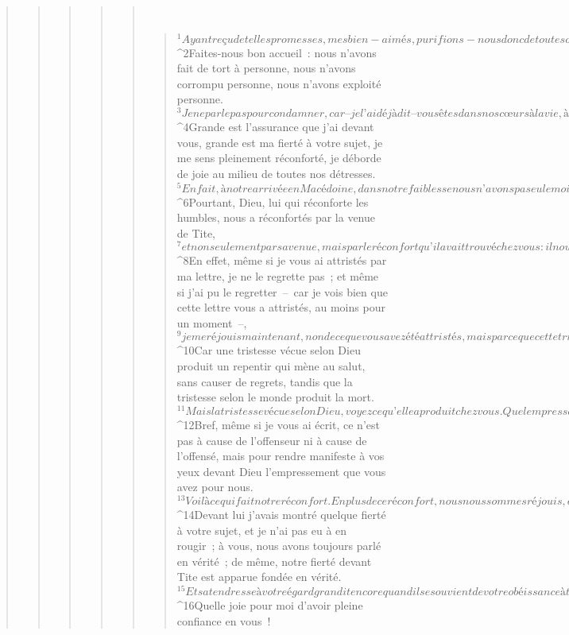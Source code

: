 \begin{verse}
\begin{verse}
\begin{verse}
\begin{verse}
\begin{verse}
         
      \bchapter{}
      \begin{verse}
${}^{1}Ayant reçu de telles promesses, mes bien-aimés, purifions-nous donc de toute souillure de la chair et de l’esprit ; achevons de nous sanctifier dans la crainte de Dieu.
${}^{2}Faites-nous bon accueil : nous n’avons fait de tort à personne, nous n’avons corrompu personne, nous n’avons exploité personne. 
${}^{3}Je ne parle pas pour condamner, car – je l’ai déjà dit – vous êtes dans nos cœurs à la vie, à la mort. 
${}^{4}Grande est l’assurance que j’ai devant vous, grande est ma fierté à votre sujet, je me sens pleinement réconforté, je déborde de joie au milieu de toutes nos détresses.
${}^{5}En fait, à notre arrivée en Macédoine, dans notre faiblesse nous n’avons pas eu le moindre répit mais nous étions dans la détresse à tout moment : au-dehors, des conflits, et au-dedans, des craintes. 
${}^{6}Pourtant, Dieu, lui qui réconforte les humbles, nous a réconfortés par la venue de Tite, 
${}^{7}et non seulement par sa venue, mais par le réconfort qu’il avait trouvé chez vous : il nous a fait part de votre grand désir de nous revoir, de votre désolation, de votre zèle pour moi, et cela m’a donné encore plus de joie. 
${}^{8}En effet, même si je vous ai attristés par ma lettre, je ne le regrette pas ; et même si j’ai pu le regretter – car je vois bien que cette lettre vous a attristés, au moins pour un moment –, 
${}^{9}je me réjouis maintenant, non de ce que vous avez été attristés, mais parce que cette tristesse vous a conduits au repentir. En effet, elle a été vécue selon Dieu, si bien que vous n’avez subi aucun dommage à cause de nous. 
${}^{10}Car une tristesse vécue selon Dieu produit un repentir qui mène au salut, sans causer de regrets, tandis que la tristesse selon le monde produit la mort. 
${}^{11}Mais la tristesse vécue selon Dieu, voyez ce qu’elle a produit chez vous. Quel empressement ! Quelles excuses ! Quelle indignation ! Quelle crainte ! Quel désir ! Quel zèle ! Quelle juste punition ! En tous points, vous avez prouvé que vous étiez irréprochables dans cette affaire. 
${}^{12}Bref, même si je vous ai écrit, ce n’est pas à cause de l’offenseur ni à cause de l’offensé, mais pour rendre manifeste à vos yeux devant Dieu l’empressement que vous avez pour nous. 
${}^{13}Voilà ce qui fait notre réconfort. En plus de ce réconfort, nous nous sommes réjouis, encore bien davantage, en voyant la joie de Tite : son esprit a été pleinement tranquillisé par vous tous. 
${}^{14}Devant lui j’avais montré quelque fierté à votre sujet, et je n’ai pas eu à en rougir ; à vous, nous avons toujours parlé en vérité ; de même, notre fierté devant Tite est apparue fondée en vérité. 
${}^{15}Et sa tendresse à votre égard grandit encore quand il se souvient de votre obéissance à tous, comment vous l’avez accueilli avec crainte et profond respect. 
${}^{16}Quelle joie pour moi d’avoir pleine confiance en vous !
      

\end{verse}
\end{verse}
\end{verse}
\end{verse}
\end{verse}
\end{verse}
